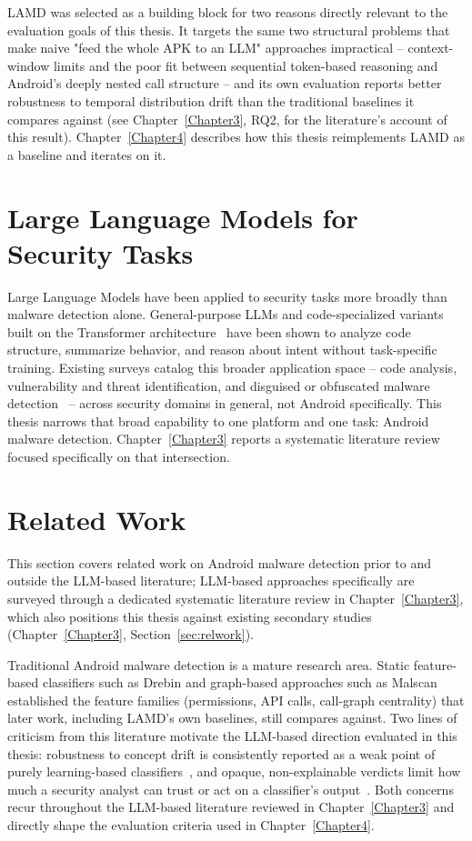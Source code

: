 LAMD was selected as a building block for two reasons directly relevant to
the evaluation goals of this thesis. It targets the same two structural
problems that make naive "feed the whole APK to an LLM" approaches
impractical -- context-window limits and the poor fit between
sequential token-based reasoning and Android's deeply nested call
structure -- and its own evaluation reports better robustness to temporal
distribution drift than the traditional baselines it compares against (see
Chapter~\ref{Chapter3}, RQ2, for the literature's account of this result).
Chapter~\ref{Chapter4} describes how this thesis reimplements LAMD as a
baseline and iterates on it.

\section{Large Language Models for Security Tasks}

Large Language Models have been applied to security tasks more broadly than
malware detection alone. General-purpose LLMs and code-specialized variants
built on the Transformer architecture~\cite{brown2020gpt3} have been shown
to analyze code structure, summarize behavior, and reason about intent
without task-specific training. Existing surveys catalog this broader
application space -- code analysis, vulnerability and threat identification,
and disguised or obfuscated malware
detection~\cite{alkaraki2024exploring,guo2025} -- across security domains
in general, not Android specifically. This thesis narrows that broad
capability to one platform and one task: Android malware detection.
Chapter~\ref{Chapter3} reports a systematic literature review focused
specifically on that intersection.

\section{Related Work}

This section covers related work on Android malware detection prior to and
outside the LLM-based literature; LLM-based approaches specifically are
surveyed through a dedicated systematic literature review in
Chapter~\ref{Chapter3}, which also positions this thesis against existing
secondary studies (Chapter~\ref{Chapter3}, Section~\ref{sec:relwork}).

Traditional Android malware detection is a mature research area. Static
feature-based classifiers such as Drebin and graph-based approaches such as
Malscan established the feature families (permissions, API calls, call-graph
centrality) that later work, including LAMD's own baselines, still compares
against. Two lines of criticism from this literature motivate the
LLM-based direction evaluated in this thesis: robustness to concept drift is
consistently reported as a weak point of purely learning-based
classifiers~\cite{barbero2022transcending,pendlebury2019tesseract}, and
opaque, non-explainable verdicts limit how much a security analyst can
trust or act on a classifier's output~\cite{Li2024-wl}. Both concerns
recur throughout the LLM-based literature reviewed in Chapter~\ref{Chapter3}
and directly shape the evaluation criteria used in Chapter~\ref{Chapter4}.

